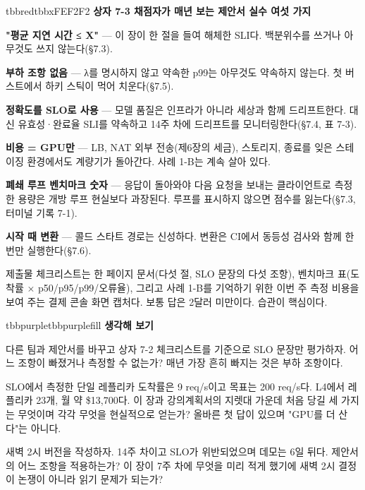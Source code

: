 \begin{calloutbox}{tbbred}{tbbxFEF2F2}
{\normalsize\bfseries\color{tbbx991B1B}상자 7-3  채점자가 매년 보는 제안서 실수 여섯 가지}\par\vspace{3pt}
\begin{tbbitemize}
  \item \textbf{"평균 지연 시간 ≤ X"} — 이 장이 한 절을 들여 해체한 SLI다. 백분위수를 쓰거나 아무것도 쓰지 않는다(§7.3).
  \item \textbf{부하 조항 없음} — λ를 명시하지 않고 약속한 p99는 아무것도 약속하지 않는다. 첫 버스트에서 하키 스틱이 먹어 치운다(§7.5).
  \item \textbf{정확도를 SLO로 사용} — 모델 품질은 인프라가 아니라 세상과 함께 드리프트한다. 대신 유효성·완료율 SLI를 약속하고 14주 차에 드리프트를 모니터링한다(§7.4, 표 7-3).
  \item \textbf{비용 = GPU만} — LB, NAT 외부 전송(제6장의 세금), 스토리지, 종료를 잊은 스테이징 환경에서도 계량기가 돌아간다. 사례 1-B는 계속 살아 있다.
  \item \textbf{폐쇄 루프 벤치마크 숫자} — 응답이 돌아와야 다음 요청을 보내는 클라이언트로 측정한 용량은 개방 루프 현실보다 과장된다. 루프를 표시하지 않으면 점수를 잃는다(§7.3, 터미널 기록 7-1).
  \item \textbf{시작 때 변환} — 콜드 스타트 경로는 신성하다. 변환은 CI에서 동등성 검사와 함께 한 번만 실행한다(§7.6).
\end{tbbitemize}
\end{calloutbox}

\vspace{3.0pt}

제출물 체크리스트는 한 페이지 문서(다섯 절, SLO 문장의 다섯 조항), 벤치마크 표(도착률 × p50/p95/p99/오류율), 그리고 사례 1-B를 기억하기 위한 이번 주 측정 비용을 보여 주는 결제 콘솔 화면 캡처다. 보통 답은 2달러 미만이다. 습관이 핵심이다.

\begin{calloutbox}{tbbpurple}{tbbpurplefill}
{\normalsize\bfseries\color{tbbpurple}생각해 보기}\par\vspace{3pt}
\begin{tbbitemize}
  \item 다른 팀과 제안서를 바꾸고 상자 7-2 체크리스트를 기준으로 SLO 문장만 평가하자. 어느 조항이 빠졌거나 측정할 수 없는가? 매년 가장 흔히 빠지는 것은 부하 조항이다.
  \item SLO에서 측정한 단일 레플리카 도착률은 9 req/s이고 목표는 200 req/s다. L4에서 레플리카 23개, 월 약 \$13,700다. 이 장과 강의계획서의 지렛대 가운데 처음 당길 세 가지는 무엇이며 각각 무엇을 현실적으로 얻는가? 올바른 첫 답이 있으며 "GPU를 더 산다"는 아니다.
  \item 새벽 2시 버전을 작성하자. 14주 차이고 SLO가 위반되었으며 데모는 6일 뒤다. 제안서의 어느 조항을 적용하는가? 이 장이 7주 차에 무엇을 미리 적게 했기에 새벽 2시 결정이 논쟁이 아니라 읽기 문제가 되는가?
\end{tbbitemize}
\end{calloutbox}

